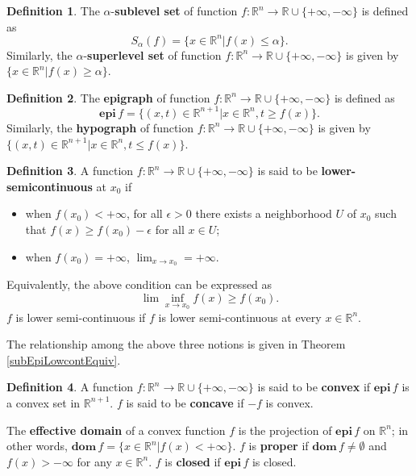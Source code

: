\documentclass[openany]{book}
\theoremstyle{definition}
\newtheorem{definition}{Definition}[chapter]
\theoremstyle{remark}
\begin{document}
\begin{definition}\label{leveld}
The $\alpha$-\textbf{sublevel set} of function $f:\mathbb{R}^n\rightarrow\mathbb{R}\cup\{+\infty,-\infty\}$ is defined as
\begin{equation}\label{sublevel}
S_{\alpha}(f)=\{x\in \mathbb{R}^n|f(x)\le\alpha\}.
\end{equation}
Similarly, the $\alpha$-\textbf{superlevel set} of function $f:\mathbb{R}^n\rightarrow\mathbb{R}\cup\{+\infty,-\infty\}$ is given by $\{x\in \mathbb{R}^n|f(x)\ge\alpha\}$.
\end{definition}
\begin{definition}\label{epid}
The \textbf{epigraph} of function $f:\mathbb{R}^n\rightarrow\mathbb{R}\cup\{+\infty,-\infty\}$ is defined as
\begin{equation}\label{epi}
\mathbf{epi}\,f=\{(x,t)\in\mathbb{R}^{n+1}|x\in \mathbb{R}^n,t\ge f(x)\}.
\end{equation}
Similarly, the \textbf{hypograph} of function $f:\mathbb{R}^n\rightarrow\mathbb{R}\cup\{+\infty,-\infty\}$ is given by $\{(x,t)\in\mathbb{R}^{n+1}|x\in \mathbb{R}^n,t\le f(x)\}$.
\end{definition}
\begin{definition}
    A function $f:\mathbb{R}^n\rightarrow\mathbb{R}\cup\{+\infty,-\infty\}$ is said to be \textbf{lower-semicontinuous} at $x_0$ if
    \begin{itemize}
        \item when $f(x_0)<+\infty$, for all $\epsilon>0$ there exists a neighborhood $U$ of $x_0$ such that $f(x)\ge f(x_0)-\epsilon$ for all $x\in U$;
        \item when $f(x_0)=+\infty$, $\lim_{x\to x_0}=+\infty$.
    \end{itemize}
    Equivalently, the above condition can be expressed as
    \begin{equation}
        \lim\inf_{x\to x_0}f(x)\ge f(x_0).
    \end{equation}
    $f$ is lower semi-continuous if $f$ is lower semi-continuous at every $x\in \mathbb{R}^n$.
\end{definition}
The relationship among the above three notions is given in Theorem \ref{subEpiLowcontEquiv}.

\begin{definition}
    A function $f:\mathbb{R}^n\to \mathbb{R}\cup\{+\infty,-\infty\}$ is said to be \textbf{convex} if $\mathbf{epi}\,f$ is a convex set in $\mathbb{R}^{n+1}$. $f$ is said to be \textbf{concave} if $-f$ is convex.
\end{definition}
The \textbf{effective domain} of a convex function $f$ is the projection of $\mathbf{epi}\,f$ on $\mathbb{R}^n$; in other words, $\mathbf{dom}\,f=\{x\in \mathbb{R}^n|f(x)<+\infty\}$. $f$ is \textbf{proper} if $\mathbf{dom}\,f\ne\emptyset$ and $f(x)>-\infty$ for any $x\in \mathbb{R}^n$. $f$ is \textbf{closed} if $\mathbf{epi}\,f$ is closed.
\end{document}

